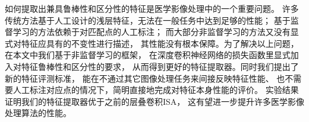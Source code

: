 如何提取出兼具鲁棒性和区分性的特征是医学影像处理中的一个重要问题。
许多传统方法基于人工设计的浅层特征，无法在一般任务中达到足够的性能；
基于监督学习的方法依赖于对匹配点的人工标注；
而大部分非监督学习的方法又没有显式对特征应具有的不变性进行描述，
其性能没有根本保障。为了解决以上问题，
在本文中我们基于非监督学习的框架，
在深度卷积神经网络的损失函数里显式加入对特征鲁棒性和区分性的要求，
从而得到更好的特征提取器。同时我们提出了新的特征评测标准，
能在不通过其它图像处理任务来间接反映特征性能、
也不需要人工标注对应点的情况下，简明直接地完成对特征本身性能的评价。
实验结果证明我们的特征提取器优于之前的层叠卷积ISA，
这有望进一步提升许多医学影像处理算法的性能。
